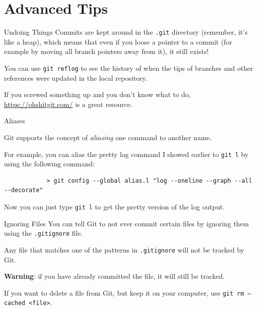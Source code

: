 \documentclass{beeper}
\begin{document}
\section{Advanced Tips}

\begin{frame}{Undoing Things}
    Commits are kept around in the \texttt{.git} directory (remember, it's like
    a heap), which means that even if you loose a pointer to a commit (for
    example by moving all branch pointers away from it), it still exists!

    You can use \texttt{git reflog} to see the history of when the tips of
    branches and other references were updated in the local repository.
    \pause

    If you screwed something up and you don't know what to do,
    \url{https://ohshitgit.com/} is a great resource.
\end{frame}


\begin{frame}[fragile]{Aliases}

    Git supports the concept of \textit{aliasing} one command to another name.

    For example, you can alias the pretty log command I showed earlier to
    \texttt{git l} by using the following command:
    {
        \scriptsize
        \begin{verbatim}
            > git config --global alias.l "log --oneline --graph --all --decorate"
        \end{verbatim}
    }

    Now you can just type \texttt{git l} to get the pretty version of the log
    output.
\end{frame}

\begin{frame}{Ignoring Files}
    You can tell Git to not ever commit certain files by ignoring them using the \texttt{.gitignore} file.

    Any file that matches one of the patterns in \texttt{.gitignore} will not be
    tracked by Git.
    \pause

    \textbf{Warning}: if you have already committed the file, it will still be
    tracked.

    If you want to delete a file from Git, but keep it on your computer, use
    \texttt{git rm --cached <file>}.
\end{frame}
\end{document}
